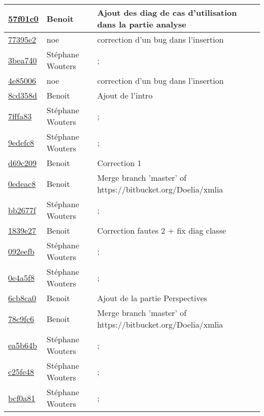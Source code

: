\begin{tabular}{l l l}
\href{57f01c033ca1827d93c9453b81f8ca31d47c35a3}{57f01c0} & Benoit & Ajout des diag de cas d'utilisation dans la partie analyse\\\hline
\href{77395e2b550e011f4e1bc047873a87075dde4194}{77395e2} & noe & correction d'un bug dans l'insertion\\\hline
\href{3bea740588aa5fe66a3a8f15efa2080e6ba89f15}{3bea740} & Stéphane Wouters & ;\\\hline
\href{4e85006279654805ba9e733c09e02cb99a540333}{4e85006} & noe & correction d'un bug dans l'insertion\\\hline
\href{8cd358d70c4143e6c4710262f084a403048acbb8}{8cd358d} & Benoit & Ajout de l'intro\\\hline
\href{7fffa8304e73f7b69cacff430403cd335a3bdeb9}{7fffa83} & Stéphane Wouters & ;\\\hline
\href{9edefc882f161943989643a262dbd30c057b9980}{9edefc8} & Stéphane Wouters & ;\\\hline
\href{d69c209e52d40356d2dafe919b64c588ed2d52ed}{d69c209} & Benoit & Correction 1\\\hline
\href{0edeac8e9c623e3e5f5950b41c7435a323c576ea}{0edeac8} & Benoit & Merge branch 'master' of https://bitbucket.org/Doelia/xmlia\\\hline
\href{bb2677f2de9056a3ff7830c6aafa5aa1f1af2288}{bb2677f} & Stéphane Wouters & ;\\\hline
\href{1839e27bdc1516f5d244eda8e1bced9fd26a2c7f}{1839e27} & Benoit & Correction fautes 2 + fix diag classe\\\hline
\href{092eefbfbf5b078b9a2647039b81906836fbc200}{092eefb} & Stéphane Wouters & ;\\\hline
\href{0e4a5f8b48b9fc918bbc57a5ff0c43f710cfe31b}{0e4a5f8} & Stéphane Wouters & ;\\\hline
\href{6cb8ca0787723483d5c86aeb2b539d614490a6aa}{6cb8ca0} & Benoit & Ajout de la partie Perspectives\\\hline
\href{78c9fc6181863d63f6f78e81df508b7db2feb765}{78c9fc6} & Benoit & Merge branch 'master' of https://bitbucket.org/Doelia/xmlia\\\hline
\href{ea5b64b1523e0d89c143107cfbeabafa7054768e}{ea5b64b} & Stéphane Wouters & ;\\\hline
\href{c25fe4875cefb2bb4cc8bd1cdbf60737b06e7ad9}{c25fe48} & Stéphane Wouters & ;\\\hline
\href{bcf0a81ff338ab788e07c8048444608d495a3ea8}{bcf0a81} & Stéphane Wouters & ;\\\hline\end{tabular}
